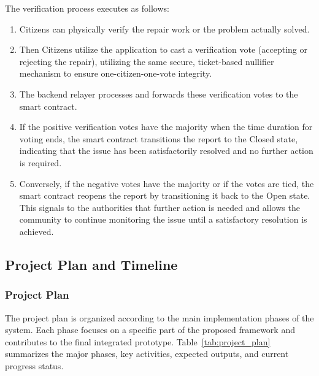 The verification process executes as follows:
\begin{enumerate}
    \item Citizens can physically verify the repair work or the problem actually solved.
    \item Then Citizens utilize the application to cast a verification vote (accepting or rejecting the repair), utilizing the same secure, ticket-based nullifier mechanism to ensure one-citizen-one-vote integrity.
    \item The backend relayer processes and forwards these verification votes to the smart contract.
    \item If the positive verification votes have the majority when the time duration for voting ends, the smart contract transitions the report to the Closed state, indicating that the issue has been satisfactorily resolved and no further action is required.
    \item Conversely, if the negative votes have the majority or if the votes are tied, the smart contract reopens the report by transitioning it back to the Open state. This signals to the authorities that further action is needed and allows the community to continue monitoring the issue until a satisfactory resolution is achieved.
\end{enumerate}




\subsection{Project Plan and Timeline}


\subsubsection{Project Plan}

The project plan is organized according to the main implementation phases of the system. Each phase focuses on a specific part of the proposed framework and contributes to the final integrated prototype. Table~\ref{tab:project_plan} summarizes the major phases, key activities, expected outputs, and current progress status.

